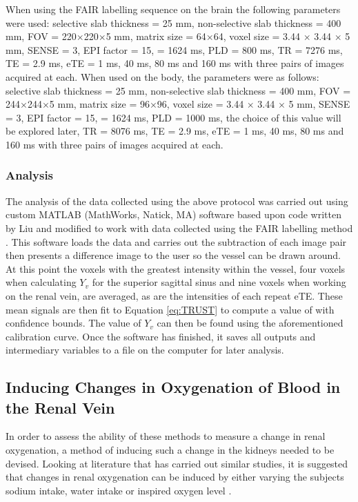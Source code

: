 When using the \ac{FAIR} labelling sequence on the brain the following parameters were used: selective slab thickness = 25 mm, non-selective slab thickness = 400 mm, \ac{FOV} = 220$\times$220$\times$5 mm, matrix size = 64$\times$64, voxel size = 3.44 $\times$ 3.44 $\times$ 5 mm, \ac{SENSE} = 3, \ac{EPI} factor = 15, \tone = 1624 ms, \ac{PLD} = 800 ms, \ac{TR} = 7276 ms, \ac{TE} = 2.9 ms, \ac{eTE} = 1 ms, 40 ms, 80 ms and 160 ms with three pairs of images acquired at each. When used on the body, the parameters were as follows: selective slab thickness = 25 mm, non-selective slab thickness = 400 mm, \ac{FOV} = 244$\times$244$\times$5 mm, matrix size = 96$\times$96, voxel size = 3.44 $\times$ 3.44 $\times$ 5 mm, \ac{SENSE} = 3, \ac{EPI} factor = 15, \tone = 1624 ms, \ac{PLD} = 1000 ms, the choice of this value will be explored later, \ac{TR} = 8076 ms, \ac{TE} = 2.9 ms, \ac{eTE} = 1 ms, 40 ms, 80 ms and 160 ms with three pairs of images acquired at each.

\subsubsection{Analysis}
\label{sec:trust_analysis}
The analysis of the data collected using the above protocol was carried out using custom \textsc{MATLAB} (MathWorks, Natick, MA) software based upon code written by Liu and modified to work with data collected using the \ac{FAIR} labelling method \cite{liu_pro_2011}. This software loads the data and carries out the subtraction of each image pair then presents a difference image to the user so the vessel can be drawn around. At this point the voxels with the greatest intensity within the vessel, four voxels when calculating $Y_v$ for the superior sagittal sinus and nine voxels when working on the renal vein, are averaged, as are the intensities of each repeat \ac{eTE}. These mean signals are then fit to Equation \eqref{eq:TRUST} to compute a value of \ttwo with confidence bounds. The value of $Y_v$ can then be found using the aforementioned calibration curve. Once the software has finished, it saves all outputs and intermediary variables to a file on the computer for later analysis.

\subsection{Inducing Changes in Oxygenation of Blood in the Renal Vein}

In order to assess the ability of these methods to measure a change in renal oxygenation, a method of inducing such a change in the kidneys needed to be devised. Looking at literature that has carried out similar studies, it is suggested that changes in renal oxygenation can be induced by either varying the subjects sodium intake, water intake or inspired oxygen level \cite{oconnor_comparison_2009, donati_quantitative_2012}.

